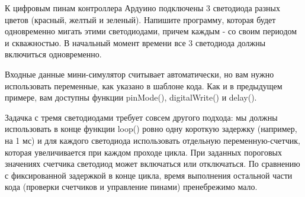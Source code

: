 
К цифровым пинам контроллера Ардуино подключены 3 светодиода разных цветов (красный, желтый и зеленый).   Напишите
программу, которая будет одновременно мигать этими светодиодами, причем каждым - со своим периодом и скважностью.  
В начальный момент времени все 3 светодиода должны включиться одновременно. 

Входные данные мини-симулятор считывает автоматически, но вам нужно использовать переменные, как указано в шаблоне кода.  Как и в предыдущем примере, вам доступны функции pinMode(), digitalWrite() и delay().

\solutionSection

Задачка с тремя светодиодами требует совсем другого подхода:  мы должны использовать в конце функции loop() ровно одну короткую задержку (например, на 1 мс) и для каждого светодиода использовать отдельную переменную-счетчик,  которая увеличивается при каждом проходе цикла.  При заданных пороговых значениях счетчика светодиод может включаться или отключаться.  По сравнению с фиксированной задержкой в конце цикла, время выполнения остальной части кода (проверки счетчиков и управление пинами) пренебрежимо мало.

